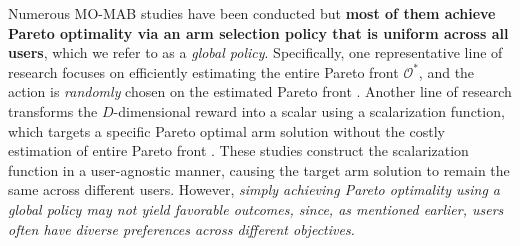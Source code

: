 Numerous MO-MAB studies have been conducted but \textbf{most of them achieve Pareto optimality via an arm selection policy that is uniform across all users}, which we refer to as a \emph{global policy}. 
Specifically, one representative line of research focuses on efficiently estimating the entire Pareto front $\mathcal{O}^*$, and the action is \emph{randomly} chosen on the estimated Pareto front \cite{drugan2013designing, turgay2018multi, lu2019multi, drugan2018covariance, balef2023piecewise}.
Another line of research transforms the $D$-dimensional reward into a scalar using a scalarization function, which targets a specific Pareto optimal arm solution without the costly estimation of entire Pareto front \cite{drugan2013designing, busa2017multi, mehrotra2020bandit, xu2023pareto}. These studies construct the scalarization function in a user-agnostic manner, causing the target arm solution to remain the same across different users.
However, \emph{simply achieving Pareto optimality using a global policy may not yield favorable outcomes, since, as mentioned earlier, users often have diverse preferences across different objectives. }
